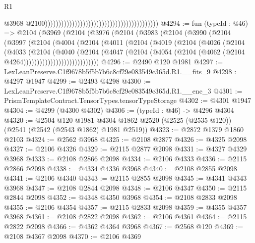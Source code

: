 \begin{lexlean}{R1}
\begin{coremodule}
                                                                                        @3968
                                                                                        @2100))))))))))))))))))))))))))))))))))))))))))
@4294 := fun (typeId : @46) =>
  @2104
    (@3969
      (@2104
        (@3976
          (@2104
            (@3983
              (@2104
                (@3990
                  (@2104
                    (@3997
                      (@2104
                        (@4004
                          (@2104
                            (@4011
                              (@2104
                                (@4019
                                  (@2104
                                    (@4026
                                      (@2104
                                        (@4033
                                          (@2104
                                            (@4040
                                              (@2104
                                                (@4047
                                                  (@2104
                                                    (@4054
                                                      (@2104
                                                        (@4062
                                                          (@2104 @4264))))))))))))))))))))))))))))
@4296 := @2490 @120 @1981
@4297 := LexLeanPreserve.C1f9678b5f5b7b6c8cf29e083549c365d.R1.__fits_9
@4298 := @4297 @1947
@4299 := @2493 @4298
@4300 := LexLeanPreserve.C1f9678b5f5b7b6c8cf29e083549c365d.R1.__enc_3
@4301 := PrismTemplateContract.TensorTypes.tensorTypeStorage
@4302 := @4301 @1947
@4304 := @4299 (@4300 @4302)
@4306 := (typeId : @46) -> @4296 @4304
@4320 := @2504
    @120
    @1981
    @4304
    @1862
    @2520
    (@2525 (@2535 @120))
    (@2541 (@2542 (@2543 @1862) @1981 @2519))
@4323 := @2872 @1379 @1860 @2103
@4324 := @2562 @3968
@4325 := @2108 @2877
@4326 := @4325 @2098
@4327 := @2106 @4326
@4329 := @2115 @2877 @2098
@4331 := @4327 @4329 @3968
@4333 := @2108 @2866 @2098
@4334 := @2106 @4333
@4336 := @2115 @2866 @2098
@4338 := @4334 @4336 @3968
@4340 := @2108 @2855 @2098
@4341 := @2106 @4340
@4343 := @2115 @2855 @2098
@4345 := @4341 @4343 @3968
@4347 := @2108 @2844 @2098
@4348 := @2106 @4347
@4350 := @2115 @2844 @2098
@4352 := @4348 @4350 @3968
@4354 := @2108 @2833 @2098
@4355 := @2106 @4354
@4357 := @2115 @2833 @2098
@4359 := @4355 @4357 @3968
@4361 := @2108 @2822 @2098
@4362 := @2106 @4361
@4364 := @2115 @2822 @2098
@4366 := @4362 @4364 @3968
@4367 := @2568 @120
@4369 := @2108 @4367 @2098
@4370 := @2106 @4369

\end{coremodule}
\end{lexlean}
